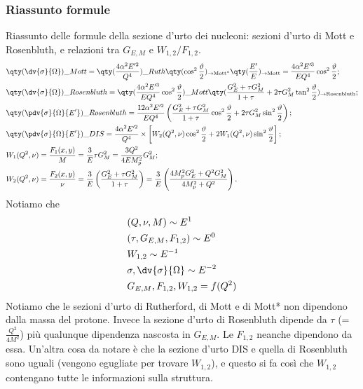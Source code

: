 \subsubsection{Riassunto formule}
Riassunto delle formule della sezione d'urto dei nucleoni: sezioni d'urto di Mott e Rosenbluth, e relazioni tra $G_{E,M}$ e $W_{1,2}/F_{1,2}$.
\begin{align*}
    &\qty(\dv{\sigma}{\Omega})\_{Mott} = \qty(\frac{4 \alpha^2 E'^2}{Q^4})\_{Ruth} \qty(\cos^2 \frac{\vartheta}{2})_{\to\text{Mott}^*} \qty(\frac{E'}E)_{\to\text{Mott}}=\frac{4\alpha^2 E'^3}{E Q^4} \cos^2 \frac{\vartheta}{2};\\
    &\qty(\dv{\sigma}{\Omega})\_{Rosenbluth}= \qty(\frac{4 \alpha^2 E'^3}{E Q^4}\cos^2\frac\vartheta2)\_{Mott} \qty( \frac{G_E^2 + \tau G_M^2}{1+\tau} + 2 \tau G_M^2 \tan^2 \frac{\vartheta}{2})_{\to\text{Rosenbluth}};\\
    &\qty(\pdv{\sigma}{\Omega}{E'})\_{Rosenbluth}= \frac{12 \alpha^2 E'^2}{E Q^4} \left( \frac{G_E^2 + \tau G_M^2}{1+\tau} \cos^2 \frac{\vartheta}{2} + 2 \tau G_M^2 \sin^2 \frac{\vartheta}{2} \right);\\
    &\qty(\pdv{\sigma}{\Omega}{E'})\_{DIS}= \frac{4 \alpha^2 E'^2}{Q^4}\times \left[ W_2(Q^2, \nu) \cos^2 \frac{\vartheta}{2} + 2 W_1(Q^2, \nu) \sin^2 \frac{\vartheta}{2} \right];\\
    &W_1(Q^2, \nu) = \frac{F_1(x, y)}{M} = \frac{3}{E} \tau G_M^2 = \frac{3 Q^2}{4 E M_p^2} G_M^2;\\
    &W_2(Q^2, \nu) = \frac{F_2(x, y)}{\nu} = \frac{3}{E} \left( \frac{G_E^2 + \tau G_M^2}{1 + \tau} \right) = \frac{3}{E} \left( \frac{4 M_p^2 G_E^2 + Q^2 G_M^2}{4 M_p^2 + Q^2} \right).
\end{align*}
Notiamo che 
\begin{align*}
&(Q,\nu,M)\sim E^1\\
&(\tau,G_{E,M},F_{1,2})\sim E^0\\
&W_{1,2}\sim E^{-1}\\
&\sigma,\dv{\sigma}{\Omega}\sim E^{-2}\\
&G_{E,M},F_{1,2},W_{1,2}=f(Q^2)
\end{align*}
Notiamo che le sezioni d'urto di Rutherford, di Mott e di Mott* non dipendono dalla massa del protone. Invece la sezione d'urto di Rosenbluth dipende da $\tau$ (=$\frac{Q^2}{4M^2}$) più qualunque dipendenza nascosta in $G_{E,M}$. Le $F_{1,2}$ neanche dipendono da essa. Un'altra cosa da notare è che la sezione d'urto DIS e quella di Rosenbluth sono uguali (vengono egugliate per trovare $W_{1,2}$), e questo si fa così che $W_{1,2}$ contengano tutte le informazioni sulla struttura.
